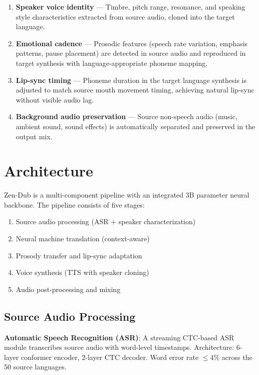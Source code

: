 \documentclass[11pt,a4paper]{article}
\begin{document}
\begin{enumerate}
\item \textbf{Speaker voice identity} --- Timbre, pitch range, resonance, and speaking
      style characteristics extracted from source audio, cloned into the target language.
\item \textbf{Emotional cadence} --- Prosodic features (speech rate variation, emphasis
      patterns, pause placement) are detected in source audio and reproduced in target
      synthesis with language-appropriate phoneme mapping.
\item \textbf{Lip-sync timing} --- Phoneme duration in the target language synthesis
      is adjusted to match source mouth movement timing, achieving natural lip-sync
      without visible audio lag.
\item \textbf{Background audio preservation} --- Source non-speech audio (music,
      ambient sound, sound effects) is automatically separated and preserved in the
      output mix.
\end{enumerate}

\section{Architecture}
\label{sec:arch}

Zen-Dub is a multi-component pipeline with an integrated 3B parameter neural backbone.
The pipeline consists of five stages:

\begin{enumerate}
\item Source audio processing (ASR + speaker characterization)
\item Neural machine translation (context-aware)
\item Prosody transfer and lip-sync adaptation
\item Voice synthesis (TTS with speaker cloning)
\item Audio post-processing and mixing
\end{enumerate}

\subsection{Source Audio Processing}

\textbf{Automatic Speech Recognition (ASR)}: A streaming CTC-based ASR module
transcribes source audio with word-level timestamps. Architecture: 6-layer conformer
encoder, 2-layer CTC decoder. Word error rate $\leq 4\%$ across the 50 source languages.
\end{document}
